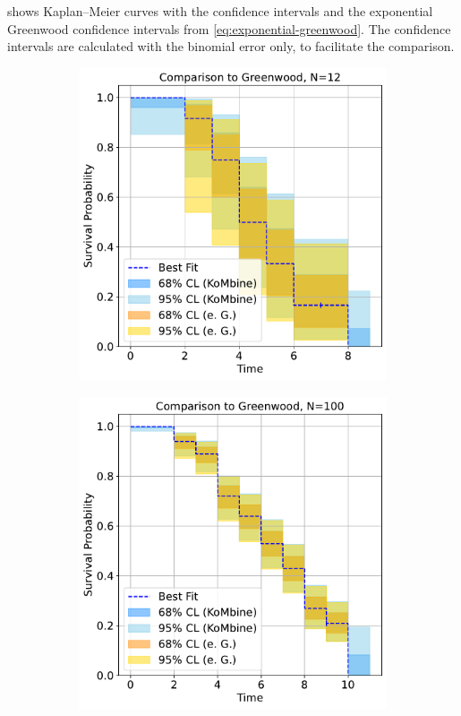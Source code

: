 \documentclass[article]{jss}
\newcommand{\KM}{Kaplan--Meier} %
\begin{document}
 shows \KM{} curves with the  confidence intervals and the exponential Greenwood confidence intervals from \cref{eq:exponential-greenwood}.  The  confidence intervals are calculated with the binomial error only, to facilitate the comparison.

\begin{figure}
\centering
\begin{subfigure}[t]{0.49\textwidth}
  \centering
  \includegraphics[width=\linewidth]{comparison_to_greenwood_small_n.pdf}
  \caption{\label{fig:compare-to-greenwood-small-n}}
\end{subfigure}
\begin{subfigure}[t]{0.49\textwidth}
  \centering
  \includegraphics[width=\linewidth]{comparison_to_greenwood_large_n.pdf}

\end{subfigure}
\end{figure}
\end{document}
